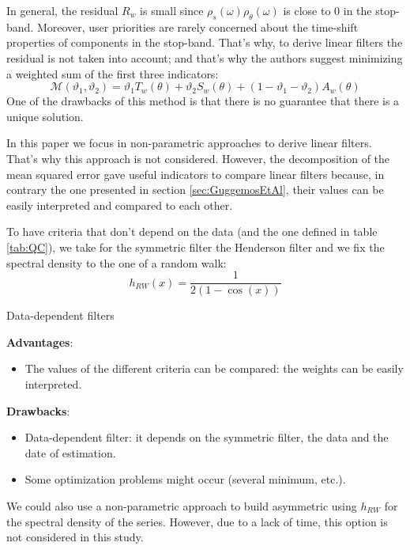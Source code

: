 \documentclass[
  12pt,
  ,
  a4paper]{article}
\providecommand{\tightlist}{%
  \setlength{\itemsep}{0pt}\setlength{\parskip}{0pt}}
\newcommand\1{\mathds{1}}
\begin{document}
In general, the residual \(R_w\) is small since \(\rho_s(\omega)\rho_\theta(\omega)\) is close to 0 in the stop-band.
Moreover, user priorities are rarely concerned about the time-shift properties of components in the stop-band.
That's why, to derive linear filters the residual is not taken into account; and that's why the authors suggest minimizing a weighted sum of the first three indicators:
\[
\mathcal{M}(\vartheta_{1},\vartheta_{2})=\vartheta_{1}T_w(\theta)+\vartheta_{2}S_w(\theta)+(1-\vartheta_{1}-\vartheta_{2})A_w(\theta)
\]
One of the drawbacks of this method is that there is no guarantee that there is a unique solution.

In this paper we focus in non-parametric approaches to derive linear filters.
That's why this approach is not considered.
However, the decomposition of the mean squared error gave useful indicators to compare linear filters because, in contrary the one presented in section \ref{sec:GuggemosEtAl}, their values can be easily interpreted and compared to each other.

To have criteria that don't depend on the data (and the one defined in table \ref{tab:QC}), we take for the symmetric filter the Henderson filter and we fix the spectral density to the one of a random walk:
\[
h_{RW}(x)=\frac{1}{2(1-\cos(x))}
\]

\begin{summary_box}{Data-dependent filters}

\textbf{Advantages}:

\begin{itemize}
\tightlist
\item
  The values of the different criteria can be compared: the weights can be easily interpreted.
\end{itemize}

\textbf{Drawbacks}:

\begin{itemize}
\item
  Data-dependent filter: it depends on the symmetric filter, the data and the date of estimation.
\item
  Some optimization problems might occur (several minimum, etc.).
\end{itemize}

\end{summary_box}

We could also use a non-parametric approach to build asymmetric using \(h_{RW}\) for the spectral density of the series.
However, due to a lack of time, this option is not considered in this study.
\end{document}
